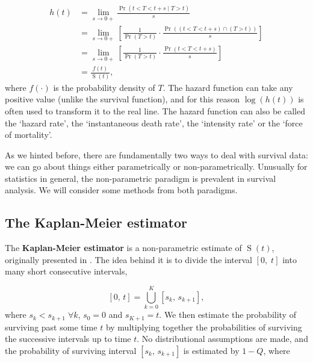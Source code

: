 \documentclass[
  openany]{book}
\theoremstyle{definition}
\theoremstyle{definition}
\theoremstyle{definition}
\theoremstyle{definition}
\theoremstyle{remark}
\begin{document}
\[
\begin{aligned}
h\left(t\right) & = \lim\limits_{s\rightarrow{0+}}\frac{\operatorname{Pr}\left(t<T<t+s\mid{T>t}\right)}{s} \\
 & = \lim\limits_{s\rightarrow{0+}}\left[\frac{1}{\operatorname{Pr}\left(T>t\right)}\cdot\frac{\operatorname{Pr}\left(\left(t<T<t+s\right)\cap\left(T>t\right)\right)}{s}\right] \\
 & = \lim\limits_{s\rightarrow{0+}}\left[\frac{1}{\operatorname{Pr}\left(T>t\right)}\cdot\frac{\operatorname{Pr}\left(t<T<t+s\right)}{s}\right]\\
 & = \frac{f\left(t\right)}{\operatorname{S}\left(t\right)},
\end{aligned}
\]
where \(f\left(\cdot\right)\) is the probability density of \(T\). The hazard function can take any positive value (unlike the survival function), and for this reason \(\log\left(h\left(t\right)\right)\) is often used to transform it to the real line. The hazard function can also be called the `hazard rate', the `instantaneous death rate', the `intensity rate' or the `force of mortality'.

As we hinted before, there are fundamentally two ways to deal with survival data: we can go about things either parametrically or non-parametrically. Unusually for statistics in general, the non-parametric paradigm is prevalent in survival analysis. We will consider some methods from both paradigms.

\hypertarget{the-kaplan-meier-estimator}{%
\subsection{The Kaplan-Meier estimator}\label{the-kaplan-meier-estimator}}

The \textbf{Kaplan-Meier estimator} is a non-parametric estimate of \(\operatorname{S}\left(t\right)\), originally presented in \citet{kaplan1958nonparametric}. The idea behind it is to divide the interval \(\left[0,\;t\right]\) into many short consecutive intervals,

\[\left[0,\,t\right] = \bigcup\limits_{k=0}^K \left[s_k,\,s_{k+1}\right],\]
where \(s_k<s_{k+1}\;\forall{k}\), \(s_0=0\) and \(s_{K+1}=t\). We then estimate the probability of surviving past some time \(t\) by multiplying together the probabilities of surviving the successive intervals up to time \(t\). No distributional assumptions are made, and the probability of surviving interval \(\left[s_k,\,s_{k+1}\right]\) is estimated by \(1-Q\), where
\end{document}
